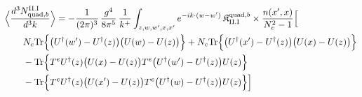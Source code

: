\begingroup\small
\begin{align}\label{eq:S-II.I-2b}
&\Big\langle\frac{d^{3}N^{\rm II.I}_{{\rm quad},b}}{d^{3}k}\Big\rangle=-\frac{1}{(2\pi)^{3}}\, \frac{g^{4}}{8\pi^{5}}\, \frac{1}{k^{+}} \int_{z,w,w',x,x'}e^{-ik\cdot(w-w')}\, \mathfrak{K}^{{\rm quad},b}_{\rm II.I} \times\frac{n(x',x)}{N_{c}^{2}-1}\Big[\notag\\
&\quad\quad N_{c}{\rm Tr}\Big\{\big(U^{\dagger}(w')-U^{\dagger}(z)\big)\big(U(w)-U(z)\big)\Big\} +N_{c}{\rm Tr}\Big\{\big(U^{\dagger}(x')-U^{\dagger}(z)\big)\big(U(x)-U(z)\big)\Big\}\notag\\
&\quad\quad -{\rm Tr}\Big\{T^{e}U^{\dagger}(z)\big(U(x)-U(z)\big)T^{e}\big(U^{\dagger}(w')-U^{\dagger}(z)\big)U(z)\Big\}\notag\\
&\quad\quad -{\rm Tr}\Big\{T^{e}U^{\dagger}(z)\big(U(x')-U(z)\big)T^{e}\big(U^{\dagger}(w)-U^{\dagger}(z)\big)U(z)\Big\}\Big]
\end{align}
\endgroup
